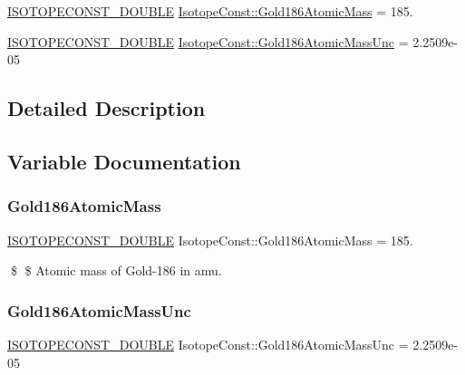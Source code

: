 \begin{DoxyCompactItemize}
\item 
\mbox{\hyperlink{group___isotope_const-_macros_ga8f45a7272ce02c0b4c65c44636ed719a}{I\+S\+O\+T\+O\+P\+E\+C\+O\+N\+S\+T\+\_\+\+D\+O\+U\+B\+LE}} \mbox{\hyperlink{group___isotope_const-_gold-_au186_ga7a84e06bb544d1e2b3f063162096d0a9}{Isotope\+Const\+::\+Gold186\+Atomic\+Mass}} = 185.
\item 
\mbox{\hyperlink{group___isotope_const-_macros_ga8f45a7272ce02c0b4c65c44636ed719a}{I\+S\+O\+T\+O\+P\+E\+C\+O\+N\+S\+T\+\_\+\+D\+O\+U\+B\+LE}} \mbox{\hyperlink{group___isotope_const-_gold-_au186_ga76a5de8473438c0565bc7f7ae19a1809}{Isotope\+Const\+::\+Gold186\+Atomic\+Mass\+Unc}} = 2.\+2509e-\/05
\end{DoxyCompactItemize}


\subsection{Detailed Description}


\subsection{Variable Documentation}
\mbox{\label{group___isotope_const-_gold-_au186_ga7a84e06bb544d1e2b3f063162096d0a9}} 
\subsubsection{\texorpdfstring{Gold186\+Atomic\+Mass}{Gold186AtomicMass}}
{\footnotesize\ttfamily \mbox{\hyperlink{group___isotope_const-_macros_ga8f45a7272ce02c0b4c65c44636ed719a}{I\+S\+O\+T\+O\+P\+E\+C\+O\+N\+S\+T\+\_\+\+D\+O\+U\+B\+LE}} Isotope\+Const\+::\+Gold186\+Atomic\+Mass = 185.}

\$ \$ Atomic mass of Gold-\/186 in amu. \mbox{\label{group___isotope_const-_gold-_au186_ga76a5de8473438c0565bc7f7ae19a1809}} 
\subsubsection{\texorpdfstring{Gold186\+Atomic\+Mass\+Unc}{Gold186AtomicMassUnc}}
{\footnotesize\ttfamily \mbox{\hyperlink{group___isotope_const-_macros_ga8f45a7272ce02c0b4c65c44636ed719a}{I\+S\+O\+T\+O\+P\+E\+C\+O\+N\+S\+T\+\_\+\+D\+O\+U\+B\+LE}} Isotope\+Const\+::\+Gold186\+Atomic\+Mass\+Unc = 2.\+2509e-\/05}

